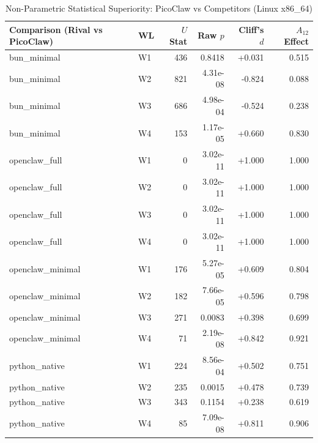 \begin{table}[t]
\centering\small
\caption{Non-Parametric Statistical Superiority: PicoClaw vs Competitors (Linux x86_64)}
\label{tab:linux_stat_tests}
\begin{tabular}{llrrrr}
\toprule
Comparison (Rival vs PicoClaw) & WL & $U$ Stat & Raw $p$ & Cliff's $d$ & $A_{12}$ Effect \\
\midrule
bun\_minimal & W1 & 436 & 0.8418 & +0.031 & 0.515 \\
bun\_minimal & W2 & 821 & 4.31e-08 & -0.824 & 0.088 \\
bun\_minimal & W3 & 686 & 4.98e-04 & -0.524 & 0.238 \\
bun\_minimal & W4 & 153 & 1.17e-05 & +0.660 & 0.830 \\
openclaw\_full & W1 & 0 & 3.02e-11 & +1.000 & 1.000 \\
openclaw\_full & W2 & 0 & 3.02e-11 & +1.000 & 1.000 \\
openclaw\_full & W3 & 0 & 3.02e-11 & +1.000 & 1.000 \\
openclaw\_full & W4 & 0 & 3.02e-11 & +1.000 & 1.000 \\
openclaw\_minimal & W1 & 176 & 5.27e-05 & +0.609 & 0.804 \\
openclaw\_minimal & W2 & 182 & 7.66e-05 & +0.596 & 0.798 \\
openclaw\_minimal & W3 & 271 & 0.0083 & +0.398 & 0.699 \\
openclaw\_minimal & W4 & 71 & 2.19e-08 & +0.842 & 0.921 \\
python\_native & W1 & 224 & 8.56e-04 & +0.502 & 0.751 \\
python\_native & W2 & 235 & 0.0015 & +0.478 & 0.739 \\
python\_native & W3 & 343 & 0.1154 & +0.238 & 0.619 \\
python\_native & W4 & 85 & 7.09e-08 & +0.811 & 0.906 \\
\bottomrule
\end{tabular}
\end{table}
